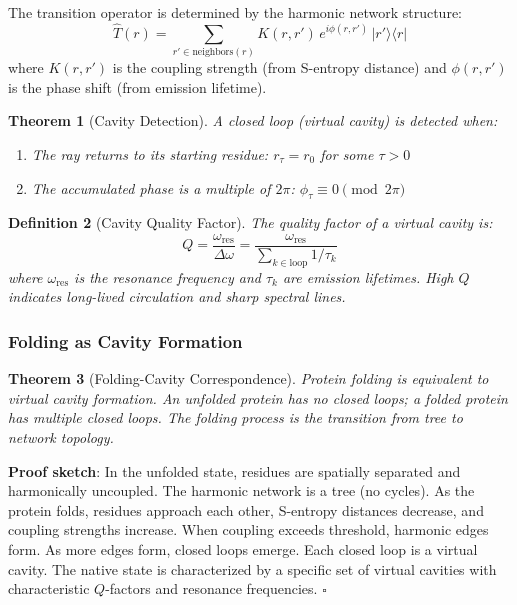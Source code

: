 \documentclass[11pt,a4paper]{article}
\newtheorem{theorem}{Theorem}[section]
\newtheorem{definition}[theorem]{Definition}
\begin{document}
The transition operator is determined by the harmonic network structure:
\begin{equation}
\hat{T}(r) = \sum_{r' \in \text{neighbors}(r)} K(r, r') \, e^{i\phi(r,r')} \, |r'\rangle\langle r|
\end{equation}
where $K(r,r')$ is the coupling strength (from S-entropy distance) and $\phi(r,r')$ is the phase shift (from emission lifetime).

\begin{theorem}[Cavity Detection]
A closed loop (virtual cavity) is detected when:
\begin{enumerate}
\item The ray returns to its starting residue: $r_\tau = r_0$ for some $\tau > 0$
\item The accumulated phase is a multiple of $2\pi$: $\phi_\tau \equiv 0 \pmod{2\pi}$
\end{enumerate}
\end{theorem}

\begin{definition}[Cavity Quality Factor]
The quality factor of a virtual cavity is:
\begin{equation}
Q = \frac{\omega_{\text{res}}}{\Delta \omega} = \frac{\omega_{\text{res}}}{\sum_{k \in \text{loop}} 1/\tau_k}
\end{equation}
where $\omega_{\text{res}}$ is the resonance frequency and $\tau_k$ are emission lifetimes. High $Q$ indicates long-lived circulation and sharp spectral lines.
\end{definition}

\subsubsection{Folding as Cavity Formation}

\begin{theorem}[Folding-Cavity Correspondence]
Protein folding is equivalent to virtual cavity formation. An unfolded protein has no closed loops; a folded protein has multiple closed loops. The folding process is the transition from tree to network topology.
\end{theorem}

\textbf{Proof sketch}: In the unfolded state, residues are spatially separated and harmonically uncoupled. The harmonic network is a tree (no cycles). As the protein folds, residues approach each other, S-entropy distances decrease, and coupling strengths increase. When coupling exceeds threshold, harmonic edges form. As more edges form, closed loops emerge. Each closed loop is a virtual cavity. The native state is characterized by a specific set of virtual cavities with characteristic $Q$-factors and resonance frequencies. $\square$
\end{document}
